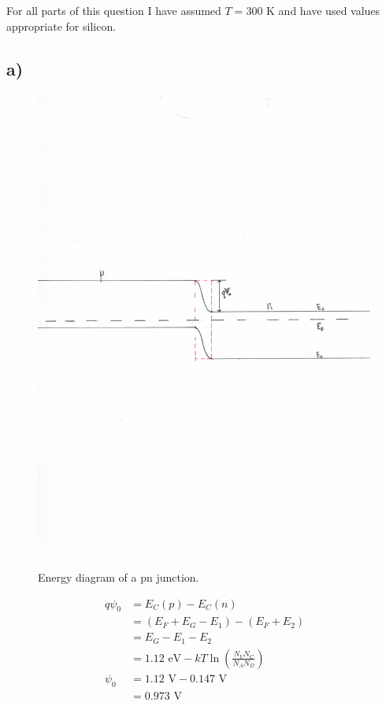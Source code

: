 For all parts of this question I have assumed $T = 300 \textrm{ K}$ and have used values appropriate for silicon.
\subsection*{a)}
	\begin{figure}[htbp!]
		\flushright
		\includegraphics[trim={3.5cm 12.5cm 2.5cm 11cm},clip]{./img/2a}
		\caption{Energy diagram of a pn junction.}
	\end{figure}
	\[
	\begin{aligned}
		q \psi_0 &= E_C(p) - E_C(n) \\
			   &= (E_F + E_G - E_1) - (E_F + E_2) \\
			   &= E_G - E_1 - E_2 \\
			   &= 1.12 \textrm{ eV} - k T \ln \left( \frac{N_V N_C}{N_A N_D} \right) \\
			\psi_0  &=	1.12 \textrm{ V} - 0.147 \textrm{ V} \\
			   &= 0.973 \textrm{ V}	   
	\end{aligned}
	\]
